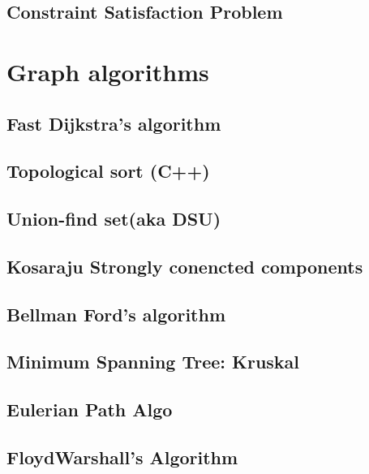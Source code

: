 \subsection{Constraint Satisfaction Problem}
\raggedbottom
\hrulefill

\section{Graph algorithms}
\subsection{Fast Dijkstra's algorithm}
\raggedbottom
\hrulefill
\subsection{Topological sort (C++)}
\raggedbottom
\hrulefill
\subsection{Union-find set(aka DSU)}
\raggedbottom
\hrulefill
\subsection{Kosaraju Strongly conencted components}
\raggedbottom
\hrulefill
\subsection{Bellman Ford's algorithm}
\raggedbottom
\hrulefill
\subsection{Minimum Spanning Tree: Kruskal}
\raggedbottom
\hrulefill
\subsection{Eulerian Path Algo}
\raggedbottom
\hrulefill
\subsection{FloydWarshall's Algorithm}
\raggedbottom
\hrulefill
